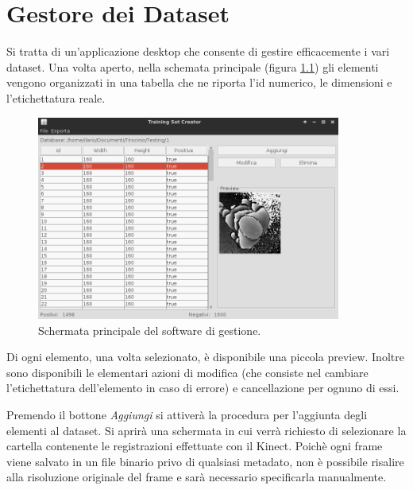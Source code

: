 

\chapter{Gestore dei Dataset} %
\label{chap:training_set_creator}
    Si tratta di un'applicazione desktop che consente di gestire efficacemente i vari dataset.
    Una volta aperto, nella schemata principale (figura \ref{fig:tsc_main}) gli elementi vengono organizzati in una tabella che ne riporta l'id numerico, le dimensioni e l'etichettatura reale.
    \begin{figure}[h]
        \centering
        \includegraphics[width=10cm]{img/training_set_creator_main.png}
        \caption{Schermata principale del software di gestione.}
        \label{fig:tsc_main}
    \end{figure}

    Di ogni elemento, una volta selezionato, è disponibile una piccola preview.
    Inoltre sono disponibili le elementari azioni di modifica (che consiste nel cambiare l'etichettatura dell'elemento in caso di errore) e cancellazione per ognuno di essi.

    Premendo il bottone \emph{Aggiungi} si attiverà la procedura per l'aggiunta degli elementi al dataset. 
    Si aprirà una schermata in cui verrà richiesto di selezionare la cartella contenente le registrazioni effettuate con il Kinect.
    Poichè ogni frame viene salvato in un file binario privo di qualsiasi metadato, non è possibile risalire alla risoluzione originale del frame e sarà necessario specificarla manualmente. 

